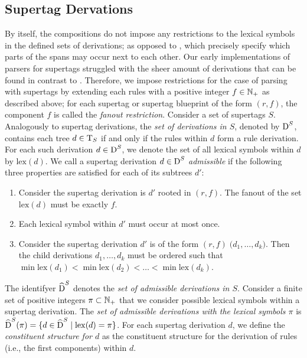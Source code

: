 \documentclass[../../document.tex]{subfiles}
\begin{document}
    \subsection*{ Supertag Dervations}
    By itself, the  compositions do not impose any restrictions to the lexical symbols in the defined sets of derivations; as opposed to , which precisely specify which parts of the spans may occur next to each other.
    Our early implementations of parsers for  supertags struggled with the sheer amount of derivations that can be found in contrast to .
    Therefore, we impose restrictions for the case of parsing with  supertags by extending each rules with a positive integer \(f\in \mathbb{N}_+\) as described above; for each  supertag or  supertag blueprint of the form \((r,f)\), the component \(f\) is called the \emph{fanout restriction}.
    Consider a set of  supertags \(S\).
    Analogously to  supertag derivations, the \emph{set of derivations in \(S\)}, denoted by \(\operatorname{D}^S\), contains each tree \(d \in \operatorname{T}_S\) if and only if the  rules within  \(d\) form a  rule derivation.
    For each such derivation \(d \in \operatorname{D}^S\), we denote the set of all lexical symbols within \(d\) by \(\mathrm{lex}(d)\).
    We call a  supertag derivation \(d \in \operatorname{D}^S\) \emph{admissible} if the following three properties are satisfied for each of its subtrees $d'$:
    \begin{enumerate}
        \item 
            Consider the  supertag derivation is $d'$ rooted in \((r,f)\).
            The fanout of the set \(\mathrm{lex}(d)\) must be exactly \(f\).
        \item
            Each lexical symbol within \(d'\) must occur at most once.
        \item\label{prop:dcp:admissible:order}
            Consider the supertag derivation $d'$ is of the form \((r,f)\;\big( d_1, \ldots, d_k \big)\).
            Then the child derivations \(d_1, \ldots, d_k\) must be ordered such that \(\min \mathrm{lex}(d_1) < \min \mathrm{lex}(d_2) < \ldots < \min \mathrm{lex}(d_k)\). 
    \end{enumerate}
    The identifyer \(\widehat{\operatorname{D}}^S\) denotes the \emph{set of admissible derivations in \(S\)}.
    Consider a finite set of positive integers \(\pi \subset \mathbb{N}_+\) that we consider possible lexical symbols within a  supertag derivation.
    The \emph{set of admissible derivations with the lexical symbols \(\pi\)} is \(\widehat{\operatorname{D}}^S(\pi) = \{d\in \widehat{\operatorname{D}}^S \mid \mathrm{lex}(d) = \pi\}\).
    For each  supertag derivation \(d\), we define the \emph{constituent structure for \(d\)} as the constituent structure for the derivation of  rules (i.e., the first components) within \(d\).
\end{document}
